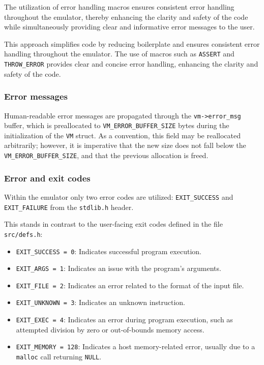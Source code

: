 \documentclass[10pt,a4paper,final]{article}
\newcommand{\code}[1]{\texttt{#1}}
\begin{document}
The utilization of error handling macros ensures consistent error handling
throughout the emulator, thereby enhancing the clarity and safety of the code
while simultaneously providing clear and informative error messages to the user.

This approach simplifies code by reducing boilerplate and ensures consistent
error handling throughout the emulator. The use of macros such as \code{ASSERT}
and \code{THROW_ERROR} provides clear and concise error handling, enhancing the
clarity and safety of the code.

\subsubsection{Error messages}
\label{sec:errormessages}

Human-readable error messages are propagated through the \code{vm->error_msg}
buffer, which is preallocated to \code{VM_ERROR_BUFFER_SIZE} bytes during the
initialization of the \code{VM} struct. As a convention, this field may be
reallocated arbitrarily; however, it is imperative that the new size does not
fall below the \code{VM_ERROR_BUFFER_SIZE}, and that the previous allocation is
freed.

\subsubsection{Error and exit codes}
\label{sec:errorcodes}

Within the emulator only two error codes are utilized: \code{EXIT_SUCCESS} and
\code{EXIT_FAILURE} from the \code{stdlib.h} header.

This stands in contrast to the user-facing exit codes defined in the file
\code{src/defs.h}:

\begin{itemize}
    \item \code{EXIT_SUCCESS = 0}: Indicates successful program execution.
    \item \code{EXIT_ARGS = 1}: Indicates an issue with the program's arguments.
    \item \code{EXIT_FILE = 2}: Indicates an error related to the format of the
        input file.
    \item \code{EXIT_UNKNOWN = 3}: Indicates an unknown instruction.
    \item \code{EXIT_EXEC = 4}: Indicates an error during program execution,
        such as attempted division by zero or out-of-bounds memory access.
    \item \code{EXIT_MEMORY = 128}: Indicates a host memory-related error,
        usually due to a \code{malloc} call returning \code{NULL}.
\end{itemize}
\end{document}
